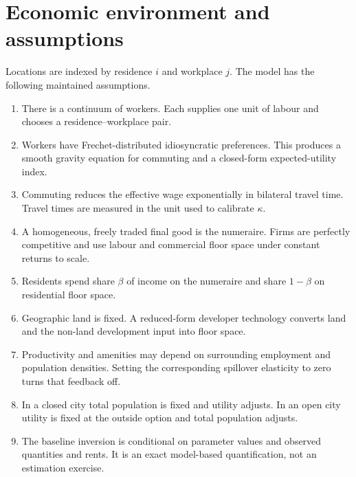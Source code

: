 \documentclass[11pt,a4paper]{article}
\begin{document}
\section{Economic environment and assumptions}
Locations are indexed by residence $i$ and workplace $j$. The model has the
following maintained assumptions.
\begin{enumerate}[label=\textbf{A\arabic*.}]
\item There is a continuum of workers. Each supplies one unit of labour and
chooses a residence--workplace pair.
\item Workers have Frechet-distributed idiosyncratic preferences. This produces
a smooth gravity equation for commuting and a closed-form expected-utility
index.
\item Commuting reduces the effective wage exponentially in bilateral travel
time. Travel times are measured in the unit used to calibrate $\kappa$.
\item A homogeneous, freely traded final good is the numeraire. Firms are
perfectly competitive and use labour and commercial floor space under constant
returns to scale.
\item Residents spend share $\beta$ of income on the numeraire and share
$1-\beta$ on residential floor space.
\item Geographic land is fixed. A reduced-form developer technology converts
land and the non-land development input into floor space.
\item Productivity and amenities may depend on surrounding employment and
population densities. Setting the corresponding spillover elasticity to zero
turns that feedback off.
\item In a closed city total population is fixed and utility adjusts. In an
open city utility is fixed at the outside option and total population adjusts.
\item The baseline inversion is conditional on parameter values and observed
quantities and rents. It is an exact model-based quantification, not an
estimation exercise.
\end{enumerate}
\end{document}
